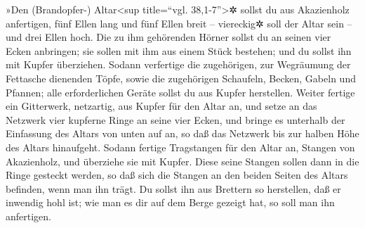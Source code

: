  »Den (Brandopfer-) Altar\textless sup title=``vgl.
38,1-7''\textgreater✲ sollst du aus Akazienholz anfertigen, fünf Ellen
lang und fünf Ellen breit -- viereckig✲ soll der Altar sein -- und drei
Ellen hoch.  Die zu ihm gehörenden Hörner sollst du an
seinen vier Ecken anbringen; sie sollen mit ihm aus einem Stück
bestehen; und du sollst ihn mit Kupfer überziehen.  Sodann
verfertige die zugehörigen, zur Wegräumung der Fettasche dienenden
Töpfe, sowie die zugehörigen Schaufeln, Becken, Gabeln und Pfannen; alle
erforderlichen Geräte sollst du aus Kupfer herstellen. 
Weiter fertige ein Gitterwerk, netzartig, aus Kupfer für den Altar an,
und setze an das Netzwerk vier kupferne Ringe an seine vier Ecken,
 und bringe es unterhalb der Einfassung des Altars von
unten auf an, so daß das Netzwerk bis zur halben Höhe des Altars
hinaufgeht.  Sodann fertige Tragstangen für den Altar an,
Stangen von Akazienholz, und überziehe sie mit Kupfer. 
Diese seine Stangen sollen dann in die Ringe gesteckt werden, so daß
sich die Stangen an den beiden Seiten des Altars befinden, wenn man ihn
trägt.  Du sollst ihn aus Brettern so herstellen, daß er
inwendig hohl ist; wie man es dir auf dem Berge gezeigt hat, so soll man
ihn anfertigen.

